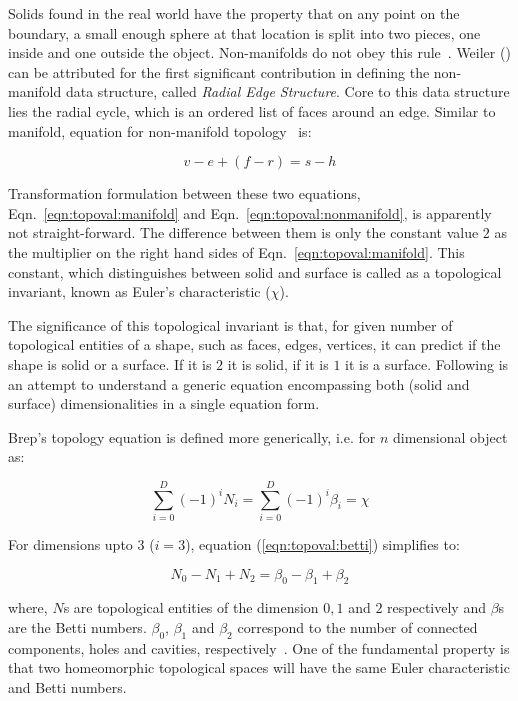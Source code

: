 Solids found in the real world have the property that on any point on the boundary, a small enough sphere at that location is split into two pieces, one inside and one outside the object. Non-manifolds do not obey this rule~\cite{Krishnamurti2002}. Weiler (\cite{Weiler1986}) can be attributed for the first significant contribution in defining the non-manifold data structure, called {\em Radial Edge Structure}. Core to this data structure lies the radial cycle, which is an ordered list of faces around an edge.  Similar to manifold, equation for non-manifold topology~\cite{Yamaguchi2002} is: 

\begin{equation}
v - e + (f - r) = s - h
\label{eqn:topoval:nonmanifold}
\end{equation}

Transformation formulation between these two equations, Eqn.~\ref{eqn:topoval:manifold} and Eqn.~\ref{eqn:topoval:nonmanifold}, is apparently not straight-forward. The difference between them is only the constant value $2$ as the multiplier on the right hand sides of Eqn.~\ref{eqn:topoval:manifold}. This constant, which distinguishes between solid and surface is called as a topological invariant, known as Euler's characteristic ($\chi$). 

The significance of this topological invariant is that, for given number of topological entities of a shape, such as faces, edges, vertices, it can predict if the shape is solid or a surface. If it is $2$ it is solid, if it is $1$ it is a surface. Following is an attempt to understand a generic equation encompassing both (solid and surface) dimensionalities in a single equation form.

Brep's topology equation is defined more generically, i.e. for $n$ dimensional object as:

\begin{equation}
\sum_{i=0 }^D(-1)^{i} N_{i}= \sum_{i=0}^D(-1)^{i} \beta_{i} = \chi 
\label{eqn:topoval:betti}
\end{equation}

For dimensions upto 3 ($i=3$), equation (\ref{eqn:topoval:betti}) simplifies to:

\begin{equation}
N_{0}-N_{1}+N_{2}= \beta_{0} -\beta_{1} + \beta_{2}
\label{eqn:topoval:betti3}
\end{equation}

where, $N$s are topological entities of the dimension $0,1$ and $2$ respectively and $\beta$s are the Betti numbers. $\beta_{0}$, $\beta_{1}$ and $\beta_{2}$ correspond to  the number of connected components, holes and cavities, respectively~\cite{Sequin}. One of the fundamental property is that two homeomorphic topological spaces will have the same Euler characteristic and Betti numbers.

